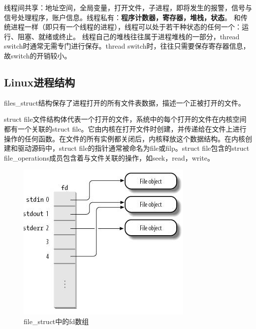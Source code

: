 线程间共享：地址空间，全局变量，打开文件，子进程，即将发生的报警，信号与信号处理程序，账户信息。线程私有：\textbf{程序计数器，寄存器，堆栈，状态}。
和传统进程一样（即只有一个线程的进程），线程可以处于若干种状态的任何一个：运行、阻塞、就绪或终止。 
线程自己的堆栈往往属于进程堆栈的一部分，thread switch时通常无需专门进行保存。thread switch时，往往只需要保存寄存器信息，故switch的开销较小。

\subsection{Linux进程结构}
files\_struct结构保存了进程打开的所有文件表数据，描述一个正被打开的文件。

struct file文件结构体代表一个打开的文件，系统中的每个打开的文件在内核空间都有一个关联的struct file。它由内核在打开文件时创建，并传递给在文件上进行操作的任何函数。在文件的所有实例都关闭后，内核释放这个数据结构。在内核创建和驱动源码中，struct file的指针通常被命名为file或filp。struct file包含的struct file\_operations成员包含着与文件关联的操作，如seek，read，write。

\begin{figure}[ht]
	\begin{center}
		\includegraphics[keepaspectratio,width=0.3\paperwidth]{Pictures/Kernel/LinuxFdArrayInFileStruct.png}
	\caption{file\_struct中的fd数组}
	\label{fig:LinuxFdArrayInFileStruct}
	\end{center}
\end{figure}

